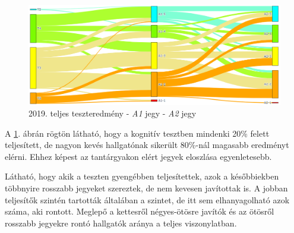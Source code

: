\documentclass[12pt]{article}
\begin{document}





\begin{figure}[H]
\centering
\includegraphics[width = \textwidth]{kepek/teszt-a1-a2.png}
\caption{2019. teljes teszteredmény - \textit{A1} jegy - \textit{A2} jegy}
\label{fig:teszt-a1-a2}
\end{figure}

A \ref{fig:teszt-a1-a2}. ábrán rögtön látható, hogy a kognitív tesztben mindenki 20\% felett teljesített, de nagyon kevés hallgatónak sikerült 80\%-nál magasabb eredményt elérni. Ehhez képest az tantárgyakon elért jegyek eloszlása egyenletesebb. 

Látható, hogy akik a teszten gyengébben teljesítettek, azok a későbbiekben többnyire rosszabb jegyeket szereztek, de nem kevesen javítottak is. A jobban teljesítők szintén tartották általában a szintet, de itt sem elhanyagolható azok száma, aki rontott. Meglepő a kettesről négyes-ötösre javítók és az ötösről rosszabb jegyekre rontó hallgatók aránya a teljes viszonylatban.
\end{document}
